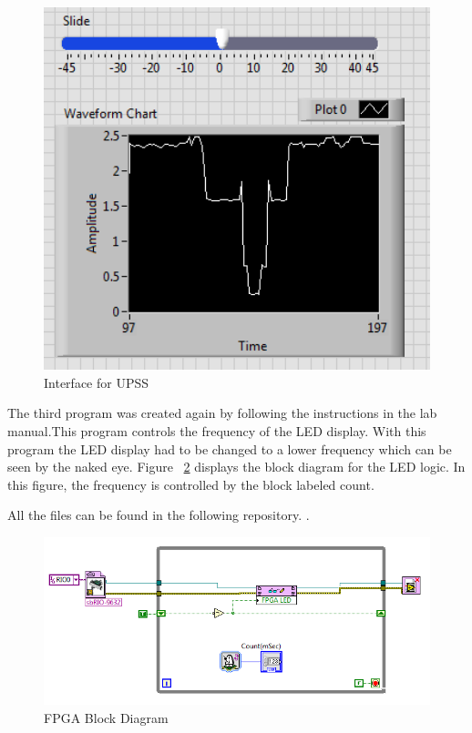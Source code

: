 \documentclass{scrartcl}
\begin{document}
\begin{figure}[H]
  \centering
    \includegraphics[width=1\textwidth]{graph2.png}
    \caption{Interface for UPSS}
    \label{fig:third}
\end{figure}

The third program was created again by following the instructions in the lab manual.This program controls the frequency of the LED display. With this program the LED display had to be changed to a lower frequency which can be seen by the naked eye. Figure ~\ref{fig:fourth} displays the block diagram for the LED logic. In this figure, the frequency is controlled by the block labeled count.


All the files can be found in the following repository. \citep{github}. 
\begin{figure}[H]
  \centering
    \includegraphics[width=1\textwidth]{fpga.png}
    \caption{FPGA Block Diagram}
    \label{fig:fourth}
\end{figure}

\listoffigures


\end{document}
